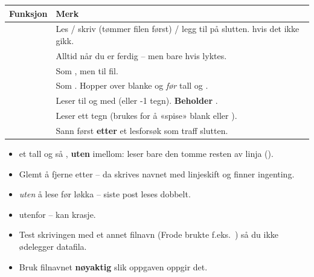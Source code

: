 \begin{center}
\begin{tabular}{@{}L{4.6cm}L{11.0cm}@{}}
\toprule
\textbf{Funksjon} & \textbf{Merk} \\
\midrule
{} & Les / skriv (tømmer filen først) / legg til på slutten.  hvis det ikke gikk. \\
 & Alltid når du er ferdig -- men bare hvis  lyktes. \\
 & Som , men til fil. \\
 & Som . Hopper over blanke og  \emph{før} tall og . \\
 & Leser til og med  (eller -1 tegn). \textbf{Beholder} . \\
 & Leser ett tegn (brukes for å «spise» blank eller ). \\
 & Sann først \textbf{etter} et lesforsøk som traff slutten. \\
\bottomrule
\end{tabular}
\end{center}

\begin{felle}
\begin{itemize}
  \item {} et tall og så , \textbf{uten } imellom:  leser bare den tomme resten av linja ().
  \item Glemt å fjerne  etter  -- da skrives navnet med linjeskift og  finner ingenting.
  \item {} \emph{uten} å lese før løkka -- siste post leses dobbelt.
  \item {} utenfor  --  kan krasje.
  \item Test skrivingen med et annet filnavn (Frode brukte f.eks.\ ) så du ikke ødelegger datafila.
  \item Bruk filnavnet \textbf{nøyaktig} slik oppgaven oppgir det.
\end{itemize}
\end{felle}
